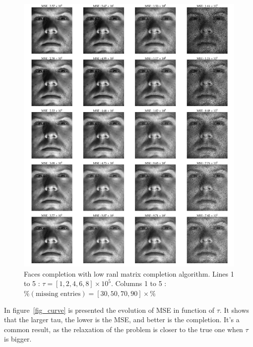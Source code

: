 \documentclass[12pt,a4paper,onecolumn]{article}
\begin{document}
\begin{figure}[H]
	\includegraphics[width = 1.0\textwidth]{2_bis.png}
	\caption{Faces completion with low ranl matrix completion algorithm. Lines 1 to 5 : \(\tau = [1, 2, 4, 6, 8] \times 10^{5}\). Columns 1 to 5 : \(\%(\text{missing entries}) = [30, 50, 70, 90]\times \%\)}
	\label{fig_faces}
\end{figure}

In figure~\ref{fig_curve} is presented the evolution of MSE in function of \(\tau\). It shows that the larger tau, the lower is the MSE, and better is the completion. It's a common result, as the relaxation of the problem is closer to the true one when \(\tau\) is bigger.
\end{document}
